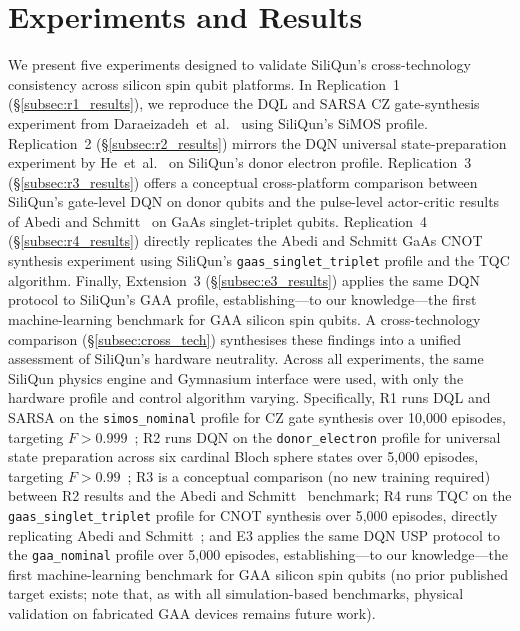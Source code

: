 \section{Experiments and Results}
\label{sec:experiments}

We present five experiments designed to validate SiliQun's cross-technology consistency across silicon spin qubit platforms. In Replication~1 (\S\ref{subsec:r1_results}), we reproduce the DQL and SARSA CZ gate-synthesis experiment from Daraeizadeh~et~al.~\cite{Daraeizadeh2020} using SiliQun's SiMOS profile. Replication~2 (\S\ref{subsec:r2_results}) mirrors the DQN universal state-preparation experiment by He~et~al.~\cite{He2021} on SiliQun's donor electron profile. Replication~3 (\S\ref{subsec:r3_results}) offers a conceptual cross-platform comparison between SiliQun's gate-level DQN on donor qubits and the pulse-level actor-critic results of Abedi and Schmitt~\cite{Abedi2025} on GaAs singlet-triplet qubits. Replication~4 (\S\ref{subsec:r4_results}) directly replicates the Abedi and Schmitt GaAs CNOT synthesis experiment using SiliQun's \texttt{gaas\_singlet\_triplet} profile and the TQC algorithm. Finally, Extension~3 (\S\ref{subsec:e3_results}) applies the same DQN protocol to SiliQun's GAA profile, establishing---to our knowledge---the first machine-learning benchmark for GAA silicon spin qubits. A cross-technology comparison (\S\ref{subsec:cross_tech}) synthesises these findings into a unified assessment of SiliQun's hardware neutrality. Across all experiments, the same SiliQun physics engine and Gymnasium interface were used, with only the hardware profile and control algorithm varying. Specifically, R1 runs DQL and SARSA on the \texttt{simos\_nominal} profile for CZ gate synthesis over 10{,}000 episodes, targeting $F > 0.999$~\cite{Daraeizadeh2020}; R2 runs DQN on the \texttt{donor\_electron} profile for universal state preparation across six cardinal Bloch sphere states over 5{,}000 episodes, targeting $F > 0.99$~\cite{He2021}; R3 is a conceptual comparison (no new training required) between R2 results and the Abedi and Schmitt~\cite{Abedi2025} benchmark; R4 runs TQC on the \texttt{gaas\_singlet\_triplet} profile for CNOT synthesis over 5{,}000 episodes, directly replicating Abedi and Schmitt~\cite{Abedi2025}; and E3 applies the same DQN USP protocol to the \texttt{gaa\_nominal} profile over 5{,}000 episodes, establishing---to our knowledge---the first machine-learning benchmark for GAA silicon spin qubits (no prior published target exists; note that, as with all simulation-based benchmarks, physical validation on fabricated GAA devices remains future work).

